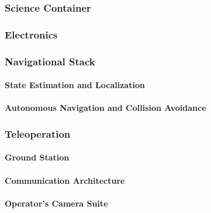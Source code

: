 \subsubsection[Science Container]{Science Container}
\label{subsubsec:science_container}


\subsubsection[Electronics]{Electronics}
\label{subsubsec:rover_electronics}


\subsubsection{Navigational Stack}
\label{subsubsec:navigational_stack}

\paragraph{State Estimation and Localization}
\label{par:state_estimation_localization}


\paragraph{Autonomous Navigation and Collision Avoidance}
\label{par:autonomous_navigation_collision_avoidance}


\subsubsection[Teleoperation]{Teleoperation\exampleflag}
\label{subsubsec:teleoperation}

\paragraph{Ground Station}
\label{par:ground_station}


\paragraph{Communication Architecture}
\label{par:teleop_communication_architecture}


\paragraph{Operator's Camera Suite}
\label{par:operators_camera_suite}


